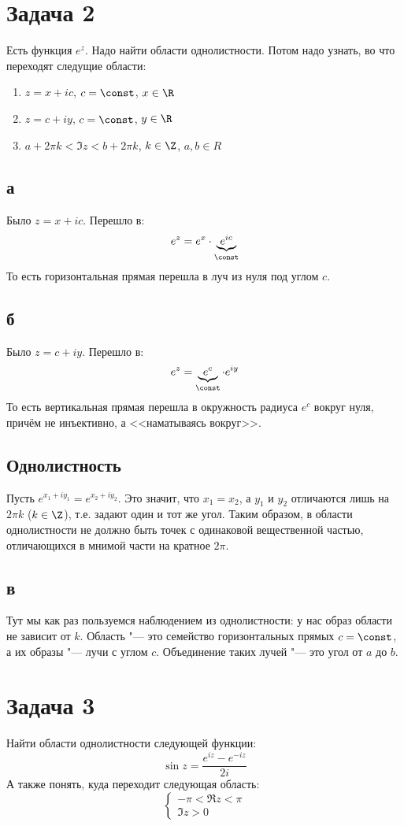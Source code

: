 \section{Задача 2}
	Есть функция $e^z$.
	Надо найти области однолистности.
	Потом надо узнать, во что переходят следущие области:
	\begin{enumerate}[label=\asbuk{enumi}.]
		\item $z=x+ic$, $c=\const$, $x \in \R$
		\item $z=c+iy$, $c=\const$, $y \in \R$
		\item $a+2\pi k < \Im z < b + 2\pi k$, $k \in \Z$, $a, b \in R$
	\end{enumerate}

	\subsection{а}
		Было $z=x+ic$.
		Перешло в:
		\[ e^z=e^x\cdot\underbrace{e^{ic}}_{\const} \]
		То есть горизонтальная прямая перешла в луч из нуля под углом $c$.

	\subsection{б}
		Было $z=c+iy$.
		Перешло в:
		\[ e^z=\underbrace{e^c}_{\const}\cdot e^{iy} \]
		То есть вертикальная прямая перешла в окружность радиуса $e^c$ вокруг нуля,
		причём не инъективно, а <<наматываясь вокруг>>.

	\subsection{Однолистность}
		Пусть $e^{x_1+iy_1}=e^{x_2+iy_2}$.
		Это значит, что $x_1=x_2$, а $y_1$ и $y_2$
		отличаются лишь на $2\pi k$ ($k \in \Z$), т.е. задают один и тот же угол.
		Таким образом, в области однолистности не должно быть точек с одинаковой вещественной частью,
		отличающихся в мнимой части на кратное $2\pi$.

	\subsection{в}
		Тут мы как раз пользуемся наблюдением из однолистности: у нас образ области не зависит от $k$.
		Область "--- это семейство горизонтальных прямых $c=\const$, а их образы "--- лучи с углом $c$.
		Объединение таких лучей "--- это угол от $a$ до $b$.

\section{Задача 3}
	Найти области однолистности следующей функции:
	\[
		\sin z = \frac{e^{iz}-e^{-iz}}{2i}
	\]
	А также понять, куда переходит следующая область:
	\[
		\begin{cases}
			-\pi < \Re z < \pi \\
			\Im z > 0
		\end{cases}
	\]

